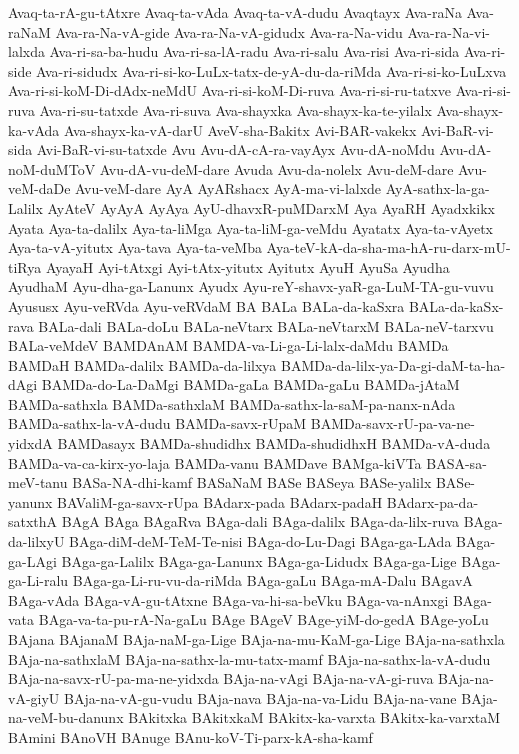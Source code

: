{Avaq-ta-rA-gu-tAtxre
Avaq-ta-vAda
Avaq-ta-vA-dudu
Avaqtayx
Ava-raNa
Ava-raNaM
Ava-ra-Na-vA-gide
Ava-ra-Na-vA-gidudx
Ava-ra-Na-vidu
Ava-ra-Na-vi-lalxda
Ava-ri-sa-ba-hudu
Ava-ri-sa-lA-radu
Ava-ri-salu
Ava-risi
Ava-ri-sida
Ava-ri-side
Ava-ri-sidudx
Ava-ri-si-ko-LuLx-tatx-de-yA-du-da-riMda
Ava-ri-si-ko-LuLxva
Ava-ri-si-koM-Di-dAdx-neMdU
Ava-ri-si-koM-Di-ruva
Ava-ri-si-ru-tatxve
Ava-ri-si-ruva
Ava-ri-su-tatxde
Ava-ri-suva
Ava-shayxka
Ava-shayx-ka-te-yilalx
Ava-shayx-ka-vAda
Ava-shayx-ka-vA-darU
AveV-sha-Bakitx
Avi-BAR-vakekx
Avi-BaR-vi-sida
Avi-BaR-vi-su-tatxde
Avu
Avu-dA-cA-ra-vayAyx
Avu-dA-noMdu
Avu-dA-noM-duMToV
Avu-dA-vu-deM-dare
Avuda
Avu-da-nolelx
Avu-deM-dare
Avu-veM-daDe
Avu-veM-dare
AyA
AyARshacx
AyA-ma-vi-lalxde
AyA-sathx-la-ga-Lalilx
AyAteV
AyAyA
AyAya
AyU-dhavxR-puMDarxM
Aya
AyaRH
Ayadxkikx
Ayata
Aya-ta-dalilx
Aya-ta-liMga
Aya-ta-liM-ga-veMdu
Ayatatx
Aya-ta-vAyetx
Aya-ta-vA-yitutx
Aya-tava
Aya-ta-veMba
Aya-teV-kA-da-sha-ma-hA-ru-darx-mU-tiRya
AyayaH
Ayi-tAtxgi
Ayi-tAtx-yitutx
Ayitutx
AyuH
AyuSa
Ayudha
AyudhaM
Ayu-dha-ga-Lanunx
Ayudx
Ayu-reY-shavx-yaR-ga-LuM-TA-gu-vuvu
Ayususx
Ayu-veRVda
Ayu-veRVdaM
BA
BALa
BALa-da-kaSxra
BALa-da-kaSx-rava
BALa-dali
BALa-doLu
BALa-neVtarx
BALa-neVtarxM
BALa-neV-tarxvu
BALa-veMdeV
BAMDAnAM
BAMDA-va-Li-ga-Li-lalx-daMdu
BAMDa
BAMDaH
BAMDa-dalilx
BAMDa-da-lilxya
BAMDa-da-lilx-ya-Da-gi-daM-ta-ha-dAgi
BAMDa-do-La-DaMgi
BAMDa-gaLa
BAMDa-gaLu
BAMDa-jAtaM
BAMDa-sathxla
BAMDa-sathxlaM
BAMDa-sathx-la-saM-pa-nanx-nAda
BAMDa-sathx-la-vA-dudu
BAMDa-savx-rUpaM
BAMDa-savx-rU-pa-va-ne-yidxdA
BAMDasayx
BAMDa-shudidhx
BAMDa-shudidhxH
BAMDa-vA-duda
BAMDa-va-ca-kirx-yo-laja
BAMDa-vanu
BAMDave
BAMga-kiVTa
BASA-sa-meV-tanu
BASa-NA-dhi-kamf
BASaNaM
BASe
BASeya
BASe-yalilx
BASe-yanunx
BAValiM-ga-savx-rUpa
BAdarx-pada
BAdarx-padaH
BAdarx-pa-da-satxthA
BAgA
BAga
BAgaRva
BAga-dali
BAga-dalilx
BAga-da-lilx-ruva
BAga-da-lilxyU
BAga-diM-deM-TeM-Te-nisi
BAga-do-Lu-Dagi
BAga-ga-LAda
BAga-ga-LAgi
BAga-ga-Lalilx
BAga-ga-Lanunx
BAga-ga-Lidudx
BAga-ga-Lige
BAga-ga-Li-ralu
BAga-ga-Li-ru-vu-da-riMda
BAga-gaLu
BAga-mA-Dalu
BAgavA
BAga-vAda
BAga-vA-gu-tAtxne
BAga-va-hi-sa-beVku
BAga-va-nAnxgi
BAga-vata
BAga-va-ta-pu-rA-Na-gaLu
BAge
BAgeV
BAge-yiM-do-gedA
BAge-yoLu
BAjana
BAjanaM
BAja-naM-ga-Lige
BAja-na-mu-KaM-ga-Lige
BAja-na-sathxla
BAja-na-sathxlaM
BAja-na-sathx-la-mu-tatx-mamf
BAja-na-sathx-la-vA-dudu
BAja-na-savx-rU-pa-ma-ne-yidxda
BAja-na-vAgi
BAja-na-vA-gi-ruva
BAja-na-vA-giyU
BAja-na-vA-gu-vudu
BAja-nava
BAja-na-va-Lidu
BAja-na-vane
BAja-na-veM-bu-danunx
BAkitxka
BAkitxkaM
BAkitx-ka-varxta
BAkitx-ka-varxtaM
BAmini
BAnoVH
BAnuge
BAnu-koV-Ti-parx-kA-sha-kamf
}
